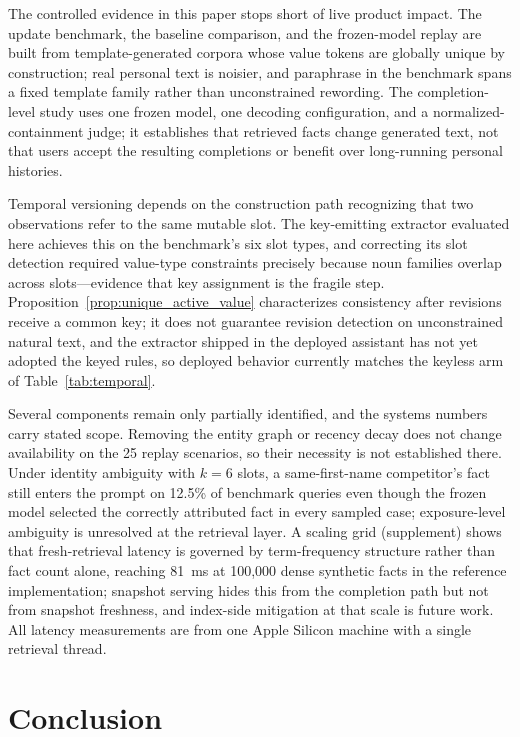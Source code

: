 \documentclass[letterpaper]{article} %
\begin{document}
The controlled evidence in this paper stops short of live product impact. The update benchmark, the baseline comparison, and the frozen-model replay are built from template-generated corpora whose value tokens are globally unique by construction; real personal text is noisier, and paraphrase in the benchmark spans a fixed template family rather than unconstrained rewording. The completion-level study uses one frozen model, one decoding configuration, and a normalized-containment judge; it establishes that retrieved facts change generated text, not that users accept the resulting completions or benefit over long-running personal histories.

Temporal versioning depends on the construction path recognizing that two observations refer to the same mutable slot. The key-emitting extractor evaluated here achieves this on the benchmark's six slot types, and correcting its slot detection required value-type constraints precisely because noun families overlap across slots---evidence that key assignment is the fragile step. Proposition~\ref{prop:unique_active_value} characterizes consistency after revisions receive a common key; it does not guarantee revision detection on unconstrained natural text, and the extractor shipped in the deployed assistant has not yet adopted the keyed rules, so deployed behavior currently matches the keyless arm of Table~\ref{tab:temporal}.

Several components remain only partially identified, and the systems numbers carry stated scope. Removing the entity graph or recency decay does not change availability on the 25 replay scenarios, so their necessity is not established there. Under identity ambiguity with $k{=}6$ slots, a same-first-name competitor's fact still enters the prompt on 12.5\% of benchmark queries even though the frozen model selected the correctly attributed fact in every sampled case; exposure-level ambiguity is unresolved at the retrieval layer. A scaling grid (supplement) shows that fresh-retrieval latency is governed by term-frequency structure rather than fact count alone, reaching 81~ms at 100{,}000 dense synthetic facts in the reference implementation; snapshot serving hides this from the completion path but not from snapshot freshness, and index-side mitigation at that scale is future work. All latency measurements are from one Apple Silicon machine with a single retrieval thread.

\section{Conclusion}
\end{document}
